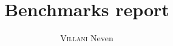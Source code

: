 \documentclass[a4paper,french]{article}
\title{Benchmarks report}
\author{\textsc{Villani} Neven}
\date{}
\begin{document}
\maketitle

\begin{center}

\end{center}
\end{document}
